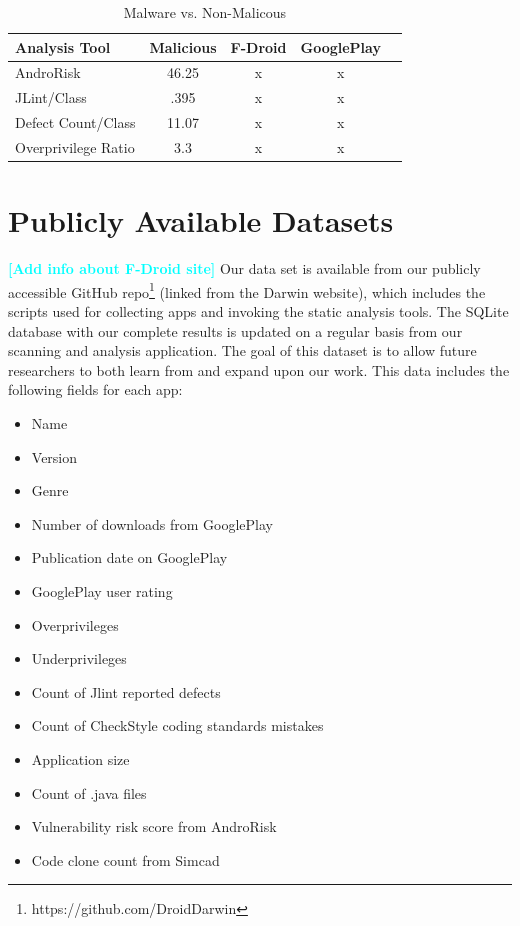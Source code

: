 \documentclass[conference]{IEEEtran}
\newcommand{\todo}[1]{\textcolor{cyan}{\textbf{[#1]}}}
\begin{document}
\begin{table}[t]
\begin{center}
\caption{Malware vs. Non-Malicous}
\label{Table:maliciousvsnonmalicious}
  \begin{tabular}{ | l | c | c | c | c |} \hline

     \bfseries Analysis Tool  & \bfseries Malicious & \bfseries F-Droid & \bfseries GooglePlay\\ \hline
    AndroRisk & 46.25 & x & x  \\ \hline
    JLint/Class & .395 & x & x  \\ \hline
    Defect Count/Class & 11.07 & x & x  \\ \hline
    Overprivilege Ratio & 3.3 & x  & x  \\ \hline
  \end{tabular}
  \end{center}
\end{table}


\section{Publicly Available Datasets}
\label{sec:dataset}

\todo{Add info about F-Droid site}
Our data set is available from our publicly accessible GitHub repo\footnote{https://github.com/DroidDarwin} (linked from the Darwin website), which includes the scripts used for collecting apps and invoking the static analysis tools. The SQLite database with our complete results is updated on a regular basis from our scanning and analysis application. The goal of this dataset is to allow future researchers to both learn from and expand upon our work. This data includes the following fields for each app:

\begin{itemize}
  \item Name
  \item Version
  \item Genre
   \item Number of downloads from GooglePlay
  \item Publication date on GooglePlay
  \item GooglePlay user rating
  \item Overprivileges
  \item Underprivileges
  \item Count of Jlint reported defects
  \item Count of CheckStyle coding standards mistakes
  \item Application size
  \item Count of .java files
  \item Vulnerability risk score from AndroRisk
  \item Code clone count from Simcad
\end{itemize}
\end{document}
